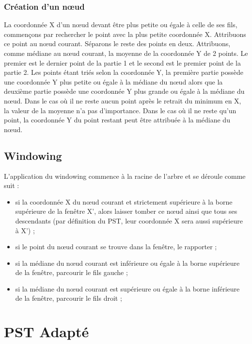 \documentclass[10pt,a4paper]{article}
\begin{document}
\subsubsection{Création d'un nœud}
La coordonnée X d'un nœud devant être plus petite ou égale à celle de ses fils, commençons par rechercher le point avec la plus petite coordonnée X. Attribuons ce point au nœud courant. Séparons le reste des points en deux. Attribuons, comme médiane au nœud courant, la moyenne de la coordonnée Y de 2 points. Le premier est le dernier point de la partie 1 et le second est le premier point de la partie 2. Les points étant triés selon la coordonnée Y, la première partie possède une coordonnée Y plus petite ou égale à la médiane du nœud alors que la deuxième partie possède une coordonnée Y plus grande ou égale à la médiane du nœud. Dans le cas où il ne reste aucun point après le retrait du minimum en X, la valeur de la moyenne n'a pas d'importance. Dans le cas où il ne reste qu'un point, la coordonnée Y du point restant peut être attribuée à la médiane du nœud.


\subsection{Windowing}
L'application du windowing commence à la racine de l'arbre et se déroule comme suit :
\begin{itemize}
	\item si la coordonnée X du nœud courant et strictement supérieure à la borne supérieure de la fenêtre X', alors laisser tomber ce nœud ainsi que tous ses descendants (par définition du PST, leur coordonnée X sera aussi supérieure à X') ;
	\item si le point du nœud courant se trouve dans la fenêtre, le rapporter ;
	\item si la médiane du nœud courant est inférieure ou égale à la borne supérieure de la fenêtre, parcourir le fils gauche ;
	\item si la médiane du nœud courant est supérieure ou égale à la borne inférieure de la fenêtre, parcourir le fils droit ;
\end{itemize}


\newpage
\section{PST Adapté}
\end{document}

